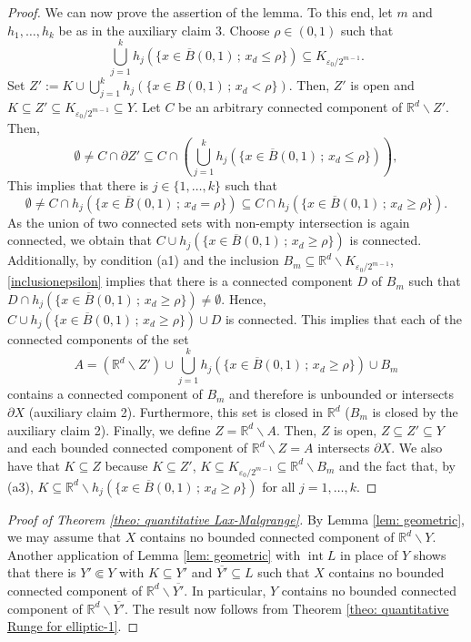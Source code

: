\documentclass[12pt]{amsart}
\newcommand{\R}{\mathbb{R}}
\theoremstyle{definition}
\theoremstyle{remark}
\numberwithin{equation}{section}
\begin{document}
\begin{proof}
	We can now prove the assertion of the lemma. To this end, let $m$ and $h_1,\ldots,h_k$ be as in the auxiliary claim 3. Choose $\rho\in (0,1)$ such that
	\begin{equation}
		\label{inclusionepsilon} 
	\bigcup_{j=1}^k h_j\left(\{x\in \overline{B}(0,1)\,;\, x_d\leq \rho\}\right)\subseteq K_{\varepsilon_0/2^{m-1}}.
	\end{equation}
	Set $Z' :=K\cup\bigcup_{j=1}^k h_j\left(\{x\in B(0,1)\,; \, x_d <\rho\}\right)$. Then, $Z'$ is  open and  $K \subseteq Z' \subseteq K_{\varepsilon_0/2^{m-1}} \subseteq Y$. Let $C$ be an arbitrary connected component of $\R^d\backslash Z'$. Then,
	$$\emptyset\neq C\cap\partial Z'\subseteq C\cap\left(\bigcup_{j=1}^k h_j\left(\{x\in \overline{B}(0,1)\,; \, x_d\leq \rho\}\right)\right),$$
This implies that there is $j \in \{1, \ldots, k\}$ such that
	$$\emptyset\neq C\cap h_j\left(\{x\in \overline{B}(0,1)\,; \,x_d= \rho\}\right)\subseteq C\cap h_j\left(\{x\in \overline{B}(0,1)\,;\,x_d\geq \rho\}\right).$$
As the union of two connected sets with non-empty intersection  is again connected, we obtain that $C\cup h_j\left(\{x\in \overline{B}(0,1)\,;\,x_d\geq \rho\}\right)$ is connected. Additionally, by condition (a1) and the inclusion $B_m \subseteq \R^d \backslash K_{\varepsilon_0/2^{m-1}}$, \eqref{inclusionepsilon} implies that there is a connected component $D$ of $B_m$ such that $D \cap h_j\left(\{x\in \overline{B}(0,1)\, ; \,x_d\geq \rho\}\right) \neq \emptyset$. Hence, $C\cup h_j\left(\{x\in \overline{B}(0,1)\, ; \,x_d\geq \rho\}\right)\cup D$ is connected. This implies that each of the  connected components of the set 
	$$ A = \left(\R^d\backslash Z'\right)\cup\bigcup_{j=1}^k h_j\left(\{x\in \overline{B}(0,1)\,;\,x_d\geq \rho\}\right)\cup B_m$$
	 contains a connected component of $B_m$ and therefore is unbounded or intersects $\partial X$ (auxiliary claim 2). Furthermore, this set is closed in $\R^d$ ($B_m$ is closed by the auxiliary claim 2).
    Finally, we define $Z = \R^d \backslash A$. Then, $Z$ is open, $Z \subseteq Z' \subseteq Y$ and each bounded connected component of $\R^d \backslash Z = A$ intersects $\partial X$. We also have that $K \subseteq Z$ because  $K \subseteq Z'$, $K \subseteq K_{\varepsilon_0/2^{m-1}} \subseteq \R^d \backslash B_m$   and the fact that, by (a3), $K \subseteq \R^d \backslash h_j\left(\{x\in \overline{B}(0,1)\,;\,x_d\geq \rho\}\right)$ for all $j = 1, \ldots, k$.	
\end{proof}

\begin{proof}[Proof of Theorem \ref{theo: quantitative Lax-Malgrange}] 
	By Lemma \ref{lem: geometric}, we may assume that $X$ contains  no bounded connected component of $\R^d\backslash Y$. Another application of Lemma \ref{lem: geometric} with $\operatorname{int} L$ in place of $Y$ shows that there is $Y' \Subset Y$ with $K \subseteq Y'$ and $\overline{Y'} \subseteq L$ such that $X$ contains no bounded connected component of $\R^d\backslash \overline{Y'}$. In particular, $Y$ contains no bounded connected component of $\R^d\backslash \overline{Y'}$. The result now follows from Theorem \ref{theo: quantitative Runge for elliptic-1}.
\end{proof}
\end{document}
